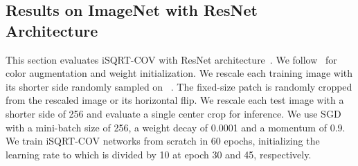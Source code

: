 \documentclass[10pt,twocolumn,letterpaper]{article}
\begin{document}
\subsection{Results  on ImageNet  with ResNet Architecture}\label{section:ImageNet-ResNet}

This section evaluates  iSQRT-COV with  ResNet architecture~\cite{He_2016_CVPR}. We  follow~\cite{Li_2017_ICCV} for color augmentation and weight initialization. We rescale each training image  with its shorter side randomly sampled on ~\cite{Simonyan15}. The fixed-size  patch is randomly cropped from the rescaled image or its horizontal flip. We rescale each test image with a shorter side of 256 and evaluate a single  center crop for inference. We use SGD with a mini-batch size of 256, a weight decay  of 0.0001 and a momentum of 0.9. We train  iSQRT-COV networks from scratch in 60 epochs, initializing    the learning rate  to  which is divided by 10 at epoch 30 and 45, respectively. 
\end{document}
